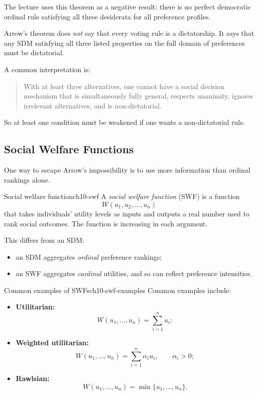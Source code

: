 The lecture uses this theorem as a negative result: there is no perfect democratic ordinal rule satisfying all three desiderata for all preference profiles.

\begin{commonmistake}
Arrow's theorem does \emph{not} say that every voting rule is a dictatorship. It says that any SDM satisfying all three listed properties on the full domain of preferences must be dictatorial.
\end{commonmistake}

\begin{examtip}
A common interpretation is:
\begin{quote}
With at least three alternatives, one cannot have a social decision mechanism that is simultaneously fully general, respects unanimity, ignores irrelevant alternatives, and is non-dictatorial.
\end{quote}
So at least one condition must be weakened if one wants a non-dictatorial rule.
\end{examtip}

\subsection{Social Welfare Functions}

One way to escape Arrow's impossibility is to use more information than ordinal rankings alone.

\begin{definition}{Social welfare function}{ch10-swf}
A \emph{social welfare function} (SWF) is a function
\[
W(u_1,u_2,\dots,u_n)
\]
that takes individuals' utility levels as inputs and outputs a real number used to rank social outcomes. The function is increasing in each argument.
\end{definition}

This differs from an SDM:
\begin{itemize}
    \item an SDM aggregates \emph{ordinal} preference rankings;
    \item an SWF aggregates \emph{cardinal} utilities, and so can reflect preference intensities.
\end{itemize}

\begin{definition}{Common examples of SWFs}{ch10-swf-examples}
Common examples include:
\begin{itemize}
    \item \textbf{Utilitarian:}
    \[
    W(u_1,\dots,u_n)=\sum_{i=1}^n u_i;
    \]
    \item \textbf{Weighted utilitarian:}
    \[
    W(u_1,\dots,u_n)=\sum_{i=1}^n \alpha_i u_i,
    \qquad \alpha_i>0;
    \]
    \item \textbf{Rawlsian:}
    \[
    W(u_1,\dots,u_n)=\min\{u_1,\dots,u_n\}.
    \]
\end{itemize}
\end{definition}

